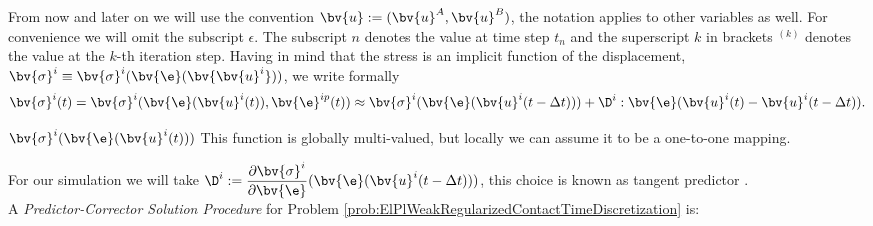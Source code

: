 From now and later on we will use the convention $\bv{u}:=(\bv{u}^{A},\bv{u}^{B})$, the notation applies to other variables as well. For convenience we will omit the subscript $\epsilon$. The subscript $n$ denotes the value at time step $t_n$ and the superscript $k$ in brackets ${}^{(k)}$ denotes the value at the $k$-th iteration step.  Having in mind that the stress is an implicit function of the displacement, $\bv{\sigma}^{i}\equiv \bv{\sigma}^{i}(\bv{\e}(\bv{\bv{u}^{i}}))$, we write formally
\begin{equation}
\bv{\sigma}^{i}(t)=\bv{\sigma}^{i}(\bv{\e}(\bv{u}^{i}(t)),\bv{\e}^{ip}(t))\approx \bv{\sigma}^{i}(\bv{\e}(\bv{u}^{i}(t-\Delta t)))+ \D^{i}:\bv{\e}(\bv{u}^{i}(t)-\bv{u}^{i}(t-\Delta t)).
\end{equation}
\begin{remark}
$\bv{\sigma}^{i}(\bv{\e}(\bv{u}^{i}(t)))$ This function is globally multi-valued, but locally we can assume it to be a one-to-one mapping.
\end{remark}
For our simulation we will take $\D^{i}:=\dfrac{\partial\bv{\sigma}^{i}}{\partial \bv{\e}}(\bv{\e}(\bv{u}^{i}(t-\Delta t)))$, this choice is known as tangent predictor \cite{Bl97,WeRe99}.\\
A \textit{Predictor-Corrector Solution Procedure} for Problem \ref{prob:ElPlWeakRegularizedContactTimeDiscretization} is:

